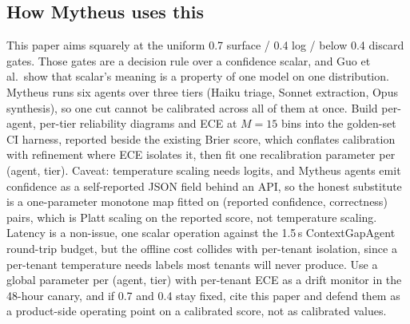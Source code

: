 \subsection{How Mytheus uses this}
\begin{takeaway}
This paper aims squarely at the uniform 0.7 surface / 0.4 log / below 0.4 discard gates. Those gates are a decision rule over a confidence scalar, and Guo et al.\ show that scalar's meaning is a property of one model on one distribution. Mytheus runs six agents over three tiers (Haiku triage, Sonnet extraction, Opus synthesis), so one cut cannot be calibrated across all of them at once. Build per-agent, per-tier reliability diagrams and ECE at $M=15$ bins into the golden-set CI harness, reported beside the existing Brier score, which conflates calibration with refinement where ECE isolates it, then fit one recalibration parameter per (agent, tier). Caveat: temperature scaling needs logits, and Mytheus agents emit confidence as a self-reported JSON field behind an API, so the honest substitute is a one-parameter monotone map fitted on (reported confidence, correctness) pairs, which is Platt scaling on the reported score, not temperature scaling. Latency is a non-issue, one scalar operation against the 1.5\,s ContextGapAgent round-trip budget, but the offline cost collides with per-tenant isolation, since a per-tenant temperature needs labels most tenants will never produce. Use a global parameter per (agent, tier) with per-tenant ECE as a drift monitor in the 48-hour canary, and if 0.7 and 0.4 stay fixed, cite this paper and defend them as a product-side operating point on a calibrated score, not as calibrated values.
\end{takeaway}

